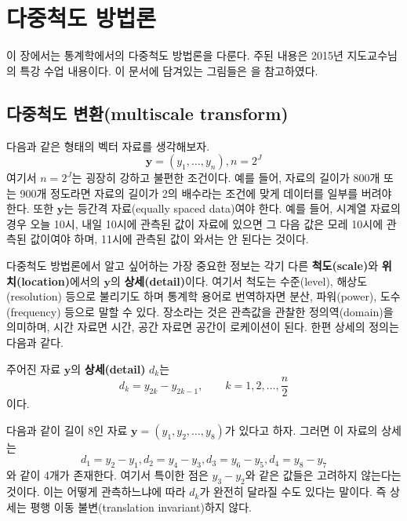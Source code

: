 \documentclass[b5paper,]{scrbook}
\theoremstyle{plain}
\theoremstyle{definition}
\numberwithin{equation}{section}
\let\BeginKnitrBlock\begin \let\EndKnitrBlock\end
\begin{document}
\hypertarget{multiscale}{%
\chapter{다중척도 방법론}\label{multiscale}}

이 장에서는 통계학에서의 다중척도 방법론을 다룬다. 주된 내용은 2015년 지도교수님의 특강 수업 내용이다. 이 문서에 담겨있는 그림들은 \citep{Nason2010}을 참고하였다.

\hypertarget{-multiscale-transform}{%
\section{다중척도 변환(multiscale transform)}\label{-multiscale-transform}}

다음과 같은 형태의 벡터 자료를 생각해보자.
\[ \mathbf{y}=(y_{1},\ldots,y_{n}), n=2^{J}\]
여기서 \(n=2^{J}\)는 굉장히 강하고 불편한 조건이다. 예를 들어, 자료의 길이가 800개 또는 900개 정도라면 자료의 길이가 2의 배수라는 조건에 맞게 데이터를 일부를 버려야 한다. 또한 \(\mathbf{y}\)는 등간격 자료(equally spaced data)여야 한다. 예를 들어, 시계열 자료의 경우 오늘 10시, 내일 10시에 관측된 값이 자료에 있으면 그 다음 값은 모레 10시에 관측된 값이여야 하며, 11시에 관측된 값이 와서는 안 된다는 것이다.

다중척도 방법론에서 알고 싶어하는 가장 중요한 정보는 각기 다른 \textbf{척도(scale)}와 \textbf{위치(location)}에서의 \(\mathbf{y}\)의 \textbf{상세(detail)}이다. 여기서 척도는 수준(level), 해상도(resolution) 등으로 불리기도 하며 통계학 용어로 번역하자면 분산, 파워(power), 도수(frequency) 등으로 말할 수 있다. 장소라는 것은 관측값을 관찰한 정의역(domain)을 의미하며, 시간 자료면 시간, 공간 자료면 공간이 로케이션이 된다. 한편 상세의 정의는 다음과 같다.

\BeginKnitrBlock{definition}[상세]
\protect\hypertarget{def:unnamed-chunk-268}{}{\label{def:unnamed-chunk-268} {} }주어진 자료 \(\mathbf{y}\)의 \textbf{상세(detail)} \(d_{k}\)는
\begin{equation}
d_{k}=y_{2k}-y_{2k-1},\qquad{k=1,2,\ldots,\frac{n}{2}}
\end{equation}
이다.
\EndKnitrBlock{definition}

\BeginKnitrBlock{example}[상세의 계산]
\protect\hypertarget{exm:unnamed-chunk-269}{}{\label{exm:unnamed-chunk-269} {} }다음과 같이 길이 8인 자료 \(\mathbf{y}=(y_{1},y_{2},\ldots,y_{8})\)가 있다고 하자. 그러면 이 자료의 상세는
\begin{equation}
d_{1}=y_{2}-y_{1}, d_{2}=y_{4}-y_{3}, d_{3}=y_{6}-y_{5}, d_{4}=y_{8}-y_{7}
\end{equation}
와 같이 4개가 존재한다. 여기서 특이한 점은 \(y_{3}-y_{2}\)와 같은 값들은 고려하지 않는다는 것이다. 이는 어떻게 관측하느냐에 따라 \(d_{k}\)가 완전히 달라질 수도 있다는 말이다. 즉 상세는 평행 이동 불변(translation invariant)하지 않다.
\EndKnitrBlock{example}
\end{document}
